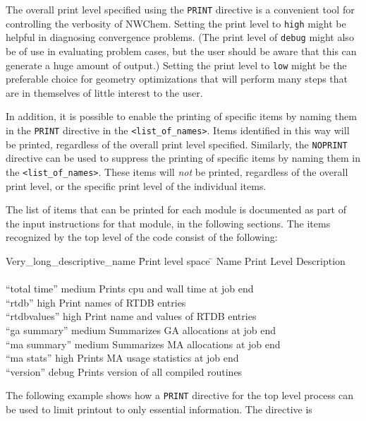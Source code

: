 The overall print level specified
using the \verb+PRINT+ directive is a convenient tool for controlling 
the verbosity
of NWChem. Setting the print level to \verb+high+ might be helpful in
diagnosing convergence problems.  (The print level of \verb+debug+ might
also be of use in evaluating problem cases, but the user should be aware
that this can generate a huge amount of output.)  Setting the print level
to \verb+low+ might be the preferable choice for geometry
optimizations that will perform many steps that are in themselves of
little interest to the user.

In addition, it is possible to enable the printing of specific
items by naming them in the \verb+PRINT+ directive in the 
\verb+<list_of_names>+.  Items identified in this way will be printed, 
regardless of the overall print level specified.  Similarly, the 
\verb+NOPRINT+ directive can be used to suppress the printing of specific
items by naming them in the \verb+<list_of_names>+.  These items will
{\em not} be printed, regardless of the overall print level, or the 
specific print level of the individual items.

The list of items that can be printed for each module is documented 
as part of the input instructions for that module, in the following
sections.  The items recognized by the top level of the code consist of
the following:
\begin{tabbing}
  Very\_long\_descriptive\_name \= Print level space \= \kill
  Name                   \> Print Level \> Description \\
                         \>        \> \\
 ``total time''        \> medium \> Prints cpu and wall time at job end\\
 ``rtdb''              \> high    \> Print names of RTDB entries\\
 ``rtdbvalues''        \> high    \> Print name and values of RTDB entries\\
 ``ga summary''        \> medium \> Summarizes GA allocations at job end \\
 ``ma summary''        \> medium \> Summarizes MA allocations at job end \\
 ``ma stats''          \> high   \> Prints MA usage statistics at job end \\
 ``version''           \> debug  \> Prints version of all compiled routines \\
\end{tabbing}


The following example shows how a \verb+PRINT+ directive for the top level
process can be used to limit printout to only essential information.
The directive is

